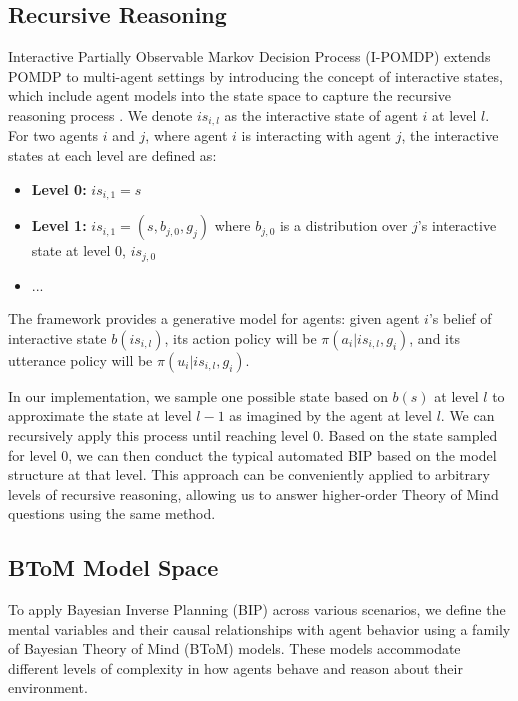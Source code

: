 \subsection{Recursive Reasoning}

Interactive Partially Observable Markov Decision Process (I-POMDP) extends POMDP to multi-agent settings by introducing the concept of interactive states, which include agent models into the state space to capture the recursive reasoning process \citep{gmytrasiewicz2005framework}.
We denote $is_{i, l}$ as the interactive state of agent $i$ at level $l$. For two agents $i$ and $j$, where agent $i$ is interacting with agent $j$, the interactive states at each level are defined as:
\begin{itemize}
\setlength\itemsep{0pt}
    \item \textbf{Level 0:} $is_{i,1}=s$
    \item \textbf{Level 1:} $is_{i,1}=(s,b_{j,0},g_j)$ where $b_{j,0}$ is a distribution over $j$'s interactive state at level 0, $is_{j,0}$
    \item ...
\end{itemize}

The framework provides a generative model for agents: given agent $i$'s belief of interactive state $b(is_{i,l})$, its action policy will be $\pi (a_i|is_{i,l},g_i)$, and its utterance policy will be $\pi (u_i|is_{i,l},g_i)$. 

In our implementation, we sample one possible state based on $b(s)$ at level $l$ to approximate the state at level $l-1$ as imagined by the agent at level $l$. We can recursively apply this process until reaching level $0$. Based on the state sampled for level $0$, we can then conduct the typical automated BIP based on the model structure at that level. This approach can be conveniently applied to arbitrary levels of recursive reasoning, allowing us to answer higher-order Theory of Mind questions using the same method.


\subsection{BToM Model Space}
\label{sec:model_space}

To apply Bayesian Inverse Planning (BIP) across various scenarios, we define the mental variables and their causal relationships with agent behavior using a family of Bayesian Theory of Mind (BToM) models. These models accommodate different levels of complexity in how agents behave and reason about their environment. 

